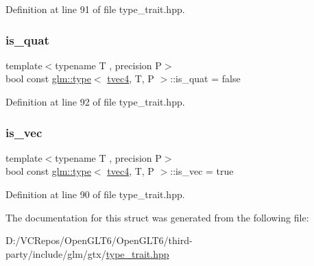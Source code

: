 Definition at line 91 of file type\+\_\+trait.\+hpp.

\mbox{\label{structglm_1_1type_3_01tvec4_00_01_t_00_01_p_01_4_aa3a4a4b0e7b22e095974264f9e1e1e40}} 
\subsubsection{\texorpdfstring{is\_quat}{is\_quat}}
{\footnotesize\ttfamily template$<$typename T , precision P$>$ \\
bool const \mbox{\hyperlink{structglm_1_1type}{glm\+::type}}$<$ \mbox{\hyperlink{structglm_1_1tvec4}{tvec4}}, T, P $>$\+::is\+\_\+quat = false\hspace{0.3cm}{\ttfamily [static]}}



Definition at line 92 of file type\+\_\+trait.\+hpp.

\mbox{\label{structglm_1_1type_3_01tvec4_00_01_t_00_01_p_01_4_a7eadb533939a5fc3bc00f4fa4682e578}} 
\subsubsection{\texorpdfstring{is\_vec}{is\_vec}}
{\footnotesize\ttfamily template$<$typename T , precision P$>$ \\
bool const \mbox{\hyperlink{structglm_1_1type}{glm\+::type}}$<$ \mbox{\hyperlink{structglm_1_1tvec4}{tvec4}}, T, P $>$\+::is\+\_\+vec = true\hspace{0.3cm}{\ttfamily [static]}}



Definition at line 90 of file type\+\_\+trait.\+hpp.



The documentation for this struct was generated from the following file\+:\begin{DoxyCompactItemize}
\item 
D\+:/\+V\+C\+Repos/\+Open\+G\+L\+T6/\+Open\+G\+L\+T6/third-\/party/include/glm/gtx/\mbox{\hyperlink{type__trait_8hpp}{type\+\_\+trait.\+hpp}}\end{DoxyCompactItemize}
